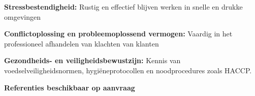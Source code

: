 	\begin{onecolentry}
		\textbf{Stressbestendigheid:} Rustig en effectief blijven werken in snelle en drukke omgevingen
	\end{onecolentry}
	
	\vspace{0.2 cm}
	
	\begin{onecolentry}
		\textbf{Conflictoplossing en probleemoplossend vermogen:} Vaardig in het professioneel afhandelen van klachten van klanten
	\end{onecolentry}
	
	\vspace{0.2 cm}
	
	\begin{onecolentry}
		\textbf{Gezondheids- en veiligheidsbewustzijn:} Kennis van voedselveiligheidsnormen, hygiëneprotocollen en noodprocedures zoals HACCP.
	\end{onecolentry}
	
	\vspace{0.2 cm}
	
	\begin{onecolentry}
		\begin{center}
			\textbf{Referenties beschikbaar op aanvraag}
		\end{center}
	\end{onecolentry}
	
	
